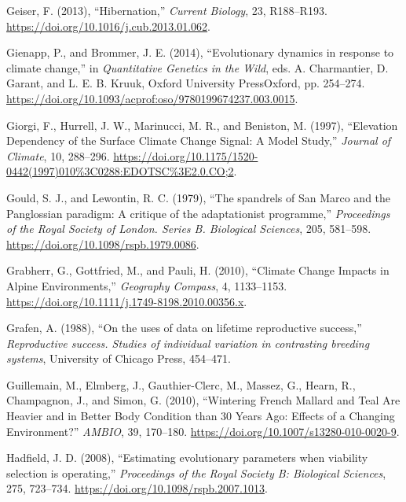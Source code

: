 \documentclass[
  12pt,
  letterpaper,
]{scrartcl}
\newlength{\cslhangindent}
\newenvironment{CSLReferences}[2] %
 {\begin{list}{}{%
  \setlength{\itemindent}{0pt}
  \setlength{\leftmargin}{0pt}
  \setlength{\parsep}{0pt}
  \ifodd #1
   \setlength{\leftmargin}{\cslhangindent}
   \setlength{\itemindent}{-1\cslhangindent}
  \fi
  \setlength{\itemsep}{#2\baselineskip}}}
 {\end{list}}
\begin{document}
\begin{CSLReferences}{1}{0}
Geiser, F. (2013), {``Hibernation,''} \emph{Current Biology}, 23,
R188--R193. \url{https://doi.org/10.1016/j.cub.2013.01.062}.

Gienapp, P., and Brommer, J. E. (2014), {``Evolutionary dynamics in
response to climate change,''} in \emph{Quantitative {Genetics} in the
{Wild}}, eds. A. Charmantier, D. Garant, and L. E. B. Kruuk, Oxford
University PressOxford, pp. 254--274.
\url{https://doi.org/10.1093/acprof:oso/9780199674237.003.0015}.

Giorgi, F., Hurrell, J. W., Marinucci, M. R., and Beniston, M. (1997),
{``Elevation {Dependency} of the {Surface Climate Change Signal}: {A
Model Study},''} \emph{Journal of Climate}, 10, 288--296.
\url{https://doi.org/10.1175/1520-0442(1997)010\%3C0288:EDOTSC\%3E2.0.CO;2}.

Gould, S. J., and Lewontin, R. C. (1979), {``The spandrels of {San
Marco} and the {Panglossian} paradigm: A critique of the adaptationist
programme,''} \emph{Proceedings of the Royal Society of London. Series
B. Biological Sciences}, 205, 581--598.
\url{https://doi.org/10.1098/rspb.1979.0086}.

Grabherr, G., Gottfried, M., and Pauli, H. (2010), {``Climate {Change
Impacts} in {Alpine Environments},''} \emph{Geography Compass}, 4,
1133--1153. \url{https://doi.org/10.1111/j.1749-8198.2010.00356.x}.

Grafen, A. (1988), {``On the uses of data on lifetime reproductive
success,''} \emph{Reproductive success. Studies of individual variation
in contrasting breeding systems}, University of Chicago Press, 454--471.

Guillemain, M., Elmberg, J., Gauthier-Clerc, M., Massez, G., Hearn, R.,
Champagnon, J., and Simon, G. (2010), {``Wintering {French Mallard} and
{Teal Are Heavier} and in {Better Body Condition} than 30 {Years Ago}:
{Effects} of a {Changing Environment}?''} \emph{AMBIO}, 39, 170--180.
\url{https://doi.org/10.1007/s13280-010-0020-9}.

Hadfield, J. D. (2008), {``Estimating evolutionary parameters when
viability selection is operating,''} \emph{Proceedings of the Royal
Society B: Biological Sciences}, 275, 723--734.
\url{https://doi.org/10.1098/rspb.2007.1013}.


\end{CSLReferences}
\end{document}
